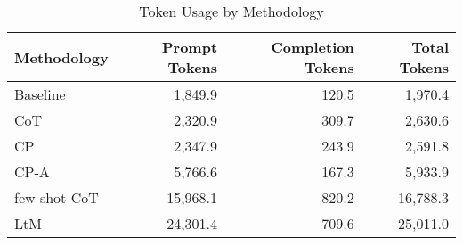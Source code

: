 \begin{table}
\caption{Token Usage by Methodology}
\label{tab:token-usage}
\begin{tabular}{lrrr}
\toprule
Methodology & Prompt Tokens & Completion Tokens & Total Tokens \\
\midrule
Baseline & 1,849.9 & 120.5 & 1,970.4 \\
CoT & 2,320.9 & 309.7 & 2,630.6 \\
CP & 2,347.9 & 243.9 & 2,591.8 \\
CP-A & 5,766.6 & 167.3 & 5,933.9 \\
few-shot CoT & 15,968.1 & 820.2 & 16,788.3 \\
LtM & 24,301.4 & 709.6 & 25,011.0 \\
\bottomrule
\end{tabular}
\end{table}
